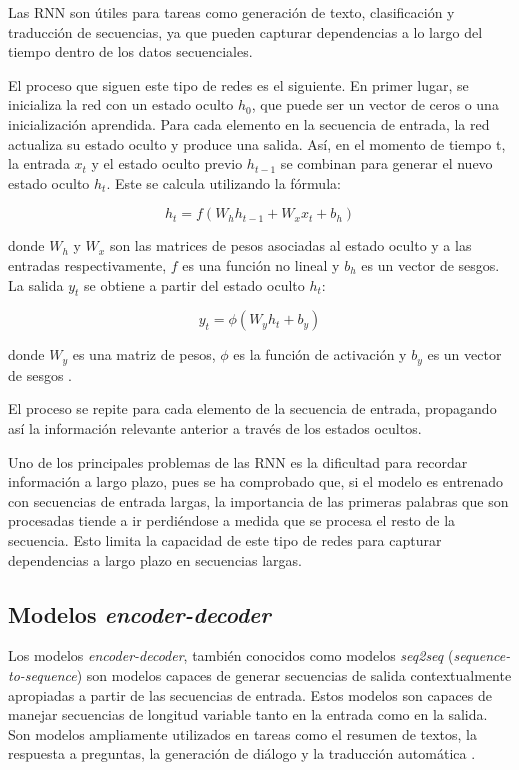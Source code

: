 \documentclass[11pt,spanish,listoffigures,listoftables]{tfgetsinf}
\begin{document}
Las RNN son útiles para tareas como generación de texto, clasificación y traducción de secuencias, ya que pueden capturar dependencias a lo largo del tiempo dentro de los datos secuenciales.

El proceso que siguen este tipo de redes es el siguiente. En primer lugar, se inicializa la red con un estado oculto $h_0$, que puede ser un vector de ceros o una inicialización aprendida. Para cada elemento en la secuencia de entrada, la red actualiza su estado oculto y produce una salida. Así, en el momento de tiempo t, la entrada $x_t$ y el estado oculto previo $h_{t-1}$ se combinan para generar el nuevo estado oculto $h_t$. Este se calcula utilizando la fórmula:

\begin{equation}
h_t = f(W_hh_{t-1} + W_xx_t + b_h)
\end{equation}

donde $W_h$ y $W_x$ son las matrices de pesos asociadas al estado oculto y a las entradas respectivamente, $f$ es una función no lineal y $b_h$ es un vector de sesgos. La salida $y_t$ se obtiene a partir del estado oculto $h_t$:

\begin{equation}
y_t = \phi(W_yh_t + b_y)
\end{equation}

donde $W_y$ es una matriz de pesos, $\phi$ es la función de activación y $b_y$ es un vector de sesgos \cite{sutskever2014sequencesequencelearningneural}.

El proceso se repite para cada elemento de la secuencia de entrada, propagando así la información relevante anterior a través de los estados ocultos.

Uno de los principales problemas de las RNN es la dificultad para recordar información a largo plazo, pues se ha comprobado que, si el modelo es entrenado con secuencias de entrada largas, la importancia de las primeras palabras que son procesadas tiende a ir perdiéndose a medida que se procesa el resto de la secuencia. Esto limita la capacidad de este tipo de redes para capturar dependencias a largo plazo en secuencias largas.

\subsection{Modelos \textit{encoder-decoder}} \label{encdec}

Los modelos \textit{encoder-decoder}, también conocidos como modelos \textit{seq2seq} (\textit{sequence-to-sequence}) son modelos capaces de generar secuencias de salida contextualmente apropiadas a partir de las secuencias de entrada. Estos modelos son capaces de manejar secuencias de longitud variable tanto en la entrada como en la salida. Son modelos ampliamente utilizados en tareas como el resumen de textos, la respuesta a preguntas, la generación de diálogo y la traducción automática \cite{jurafsky2023speech}.
\end{document}
